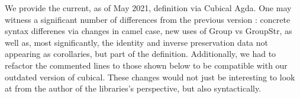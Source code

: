 We provide the current, as of May 2021, definition via Cubical Agda. One may
witness a significant number of differences from the previous version :
concrete syntax differenes via changes in camel case, new uses of Group vs
GroupStr, as well as, most significantly, the identity and inverse preservation
data not appearing as corollaries, but part of the definition. Additionally, we
had to refactor the commented lines to those shown below to be compatible with
our outdated version of cubical.  These changes would not just be interesting
to look at from the author of the libraries's perspective, but also
syntactically.
\begin{code}%
%
\>[2]\AgdaSpace{}%
\AgdaSpace{}%
\AgdaSymbol{\{}\AgdaSpace{}%
\AgdaSymbol{:}\AgdaSpace{}%
\AgdaSpace{}%
\AgdaSymbol{\}}\AgdaSpace{}%
\AgdaSymbol{\{}\AgdaSpace{}%
\AgdaSymbol{:}\AgdaSpace{}%
\AgdaSpace{}%
\AgdaSymbol{\}}\<%
\\
\>[2][@{}l@{\AgdaIndent{0}}]%
\>[4]\AgdaSymbol{(}\AgdaSpace{}%
\AgdaSymbol{:}\AgdaSpace{}%
\AgdaSpace{}%
\AgdaSymbol{)}\AgdaSpace{}%
\AgdaSymbol{(}\AgdaSpace{}%
\AgdaSymbol{:}\AgdaSpace{}%
\AgdaSpace{}%
\AgdaSpace{}%
\AgdaSymbol{)}\AgdaSpace{}%
\AgdaSymbol{(}\AgdaSpace{}%
\AgdaSymbol{:}\AgdaSpace{}%
\AgdaSpace{}%
\AgdaSymbol{)}\<%
\\
%
\>[4]\AgdaSymbol{:}\AgdaSpace{}%
\AgdaSpace{}%
\AgdaSymbol{(}\AgdaSpace{}%
\AgdaSpace{}%
\AgdaSymbol{)}\<%
\\
%
\>[4]\<%
\\
%
\\[\AgdaEmptyExtraSkip]%
%
\>[4]\<%
\\
%
\>[4]\<%
\\
\>[4][@{}l@{\AgdaIndent{0}}]%
\>[6]\AgdaSpace{}%
\AgdaSpace{}%
\AgdaSymbol{=}\AgdaSpace{}%
\AgdaSpace{}%
\<%
\\
%
\>[6]\AgdaSpace{}%
\AgdaSpace{}%
\AgdaSymbol{=}\AgdaSpace{}%
\AgdaSpace{}%
\<%
\\
%
\\[\AgdaEmptyExtraSkip]%

\end{code}

